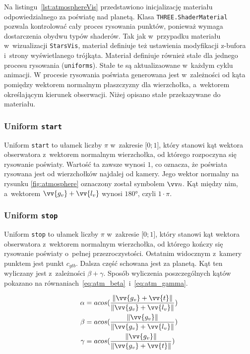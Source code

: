 Na listingu~\ref{lst:atmosphereVis} przedstawiono inicjalizację materiału odpowiedzialnego za poświatę nad planetą. Klasa \texttt{THREE.ShaderMaterial} pozwala kontrolować cały proces rysowania punktów, ponieważ wymaga dostarczenia obydwu typów shaderów. Tak jak w~przypadku materiału w~wizualizacji \texttt{StarsVis}, materiał definiuje też ustawienia modyfikacji z-bufora i~strony wyświetlanego trójkąta. Materiał definiuje również stałe dla jednego procesu rysowania (\texttt{uniforms}). Stałe te są aktualizaowane w~każdym cyklu animacji. 
W procesie rysowania poświata generowana jest w~zależności od kąta pomiędzy wektorem normalnym płaszczyzny dla wierzchołka, a~wektorem określającym kierunek obserwacji. Niżej opisano stałe przekazywane do materiału.

\subsubsection{Uniform \texttt{start}}
Uniform \texttt{start} to ułamek liczby $\pi$ w~zakresie $\lbrack0; 1\rbrack$, który stanowi kąt wektora obserwatora z~wektorem normalnym wierzchołka, od którego rozpoczyna się rysowanie poświaty. Wartość ta zawsze wynosi $1$, co oznacza, że poświata rysowana jest od wierzchołków najdalej od kamery. Jego wektor normalny na rysunku \ref{fig:atmosphere} oznaczony został symbolem $\vv n$. Kąt między nim, a~wektorem $\vv{g_v} + \vv{l_v}$ wynosi $\ang{180}$, czyli $1 \cdot \pi$.

\subsubsection{Uniform \texttt{stop}}
Uniform \texttt{stop} to ułamek liczby $\pi$ w~zakresie $\lbrack0; 1\rbrack$, który stanowi kąt wektora obserwatora z~wektorem normalnym wierzchołka, od którego kończy się rysowanie poświaty o~pełnej przezroczystości. Ostatnim widocznym z~kamery punktem jest punkt $c_{gtb}$. Dalsza część schowana jest za planetą. Kąt ten wyliczany jest z~zależności $\beta+\gamma$. Sposób wyliczenia poszczególnych kątów pokazano na równaniach~\ref{eq:atm_beta}~i~\ref{eq:atm_gamma}.

\begin{align}
  \label{eq:atm_alfa}
  \alpha &= acos(\frac{\length{\vv{g_v}+\vv{t}}}{\length{\vv{g_v}+\vv{l_v}}}) \\
  \label{eq:atm_beta}
  \beta &= acos(\frac{\length{\vv{g_v}}}{\length{\vv{g_v}+\vv{l_v}}}) \\
  \label{eq:atm_gamma}
  \gamma &= acos(\frac{\length{\vv{g_v}}}{\length{\vv{g_v}+\vv{t}}})
\end{align}


